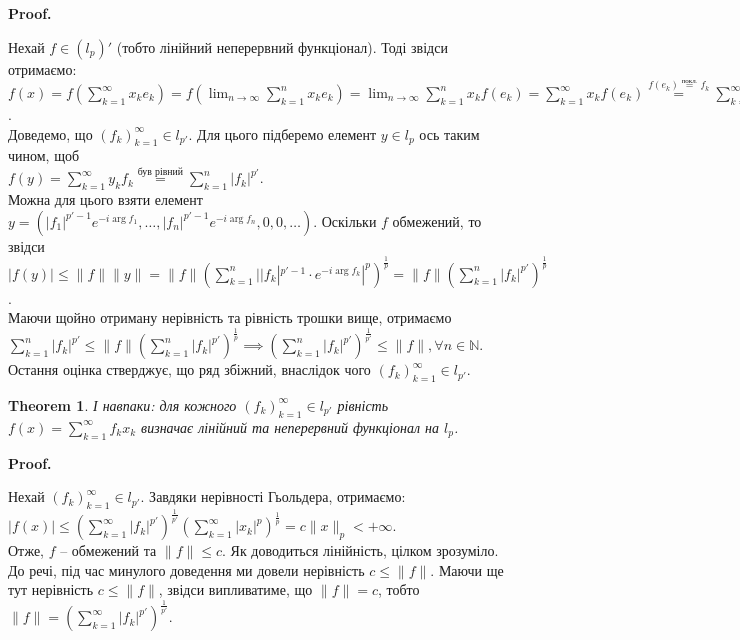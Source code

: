 \documentclass[a4paper, 10pt]{article}
\makeatletter
\theoremstyle{theoremdd}
\newtheorem{theorem}{Theorem}[subsection]
\theoremstyle{theoremdd}
\theoremstyle{theoremdd}
\theoremstyle{theoremdd}
\theoremstyle{theoremdd}
\theoremstyle{theoremdd}
\theoremstyle{theoremdd}
\theoremstyle{theoremdd}
\renewenvironment{proof}[1][Proof.\\]{\par
\pushQED{\hfill \qed}%
\normalfont \topsep6\p@\@plus6\p@\relax
\trivlist
\item\relax
{\bfseries
#1\@addpunct{.}}\hspace\labelsep\ignorespaces
}{%
\popQED\endtrivlist\@endpefalse
}
\makeatother
\begin{document}
\begin{proof}
Нехай $f \in (l_p)'$ (тобто лінійний неперервний функціонал). Тоді звідси отримаємо:\\
$f(x) = \displaystyle f\left( \sum_{k=1}^\infty x_k e_k \right) = f\left( \lim_{n \to \infty} \sum_{k=1}^n x_k e_k \right) = \lim_{n \to \infty} \sum_{k=1}^n x_k f(e_k) = \sum_{k=1}^\infty x_k f(e_k) \overset{f(e_k) \overset{\text{покл.}}{=} f_k}{=} \sum_{k=1}^\infty f_k x_k$.\\
Доведемо, що $(f_k)_{k=1}^\infty \in l_{p'}$. Для цього підберемо елемент $y \in l_p$ ось таким чином, щоб\\
$f(y) = \displaystyle\sum_{k=1}^\infty y_k f_k \overset{\text{був рівний}}{=} \sum_{k=1}^n |f_k|^{p'}$.\\
Можна для цього взяти елемент $y = \left( |f_1|^{p'-1}e^{-i \arg f_1}, \dots, |f_n|^{p'-1}e^{-i \arg f_n}, 0, 0, \dots \right)$. Оскільки $f$ обмежений, то звідси $\displaystyle |f(y)| \leq \|f\| \|y\| = \|f\| \left( \sum_{k=1}^n  ||f_k|^{p'-1} \cdot e^{-i \arg f_k}|^p \right)^{\frac{1}{p}} = \|f\| \left( \sum_{k=1}^n |f_k|^{p'} \right)^{\frac{1}{p}}$.\\
Маючи щойно отриману нерівність та рівність трошки вище, отримаємо\\
$\displaystyle\sum_{k=1}^n |f_k|^{p'} \leq \| f\| \left( \sum_{k=1}^n |f_k|^{p'} \right)^{\frac{1}{p}} \implies \left( \sum_{k=1}^n |f_k|^{p'} \right)^{\frac{1}{p'}} \leq \|f\|, \forall n \in \mathbb{N}$.\\
Остання оцінка стверджує, що ряд збіжний, внаслідок чого $(f_k)_{k=1}^{\infty} \in l_{p'}$.
\end{proof}

\begin{theorem}
І навпаки: для кожного $(f_k)_{k=1}^\infty \in l_{p'}$ рівність $f(x) = \displaystyle\sum_{k=1}^\infty f_k x_k$ визначає лінійний та неперервний функціонал на $l_p$.
\end{theorem}

\begin{proof}
Нехай $(f_k)_{k=1}^\infty \in l_{p'}$. Завдяки нерівності Гьольдера, отримаємо:\\
$\displaystyle |f(x)| \leq \left( \sum_{k=1}^\infty |f_k|^{p'} \right)^{\frac{1}{p'}} \left( \sum_{k=1}^\infty |x_k|^p \right)^{\frac{1}{p}} = c \| x \|_p < +\infty$.\\
Отже, $f$ -- обмежений та $\|f\| \leq c$. Як доводиться лінійність, цілком зрозуміло.
\bigskip \\
До речі, під час минулого доведення ми довели нерівність $c \leq \|f\|$. Маючи ще тут нерівність $c \leq \|f\|$, звідси випливатиме, що $\|f\| = c$, тобто $\|f\| =  \displaystyle\left( \sum_{k=1}^\infty |f_k|^{p'} \right)^{\frac{1}{p'}}$.
\end{proof}
\end{document}
